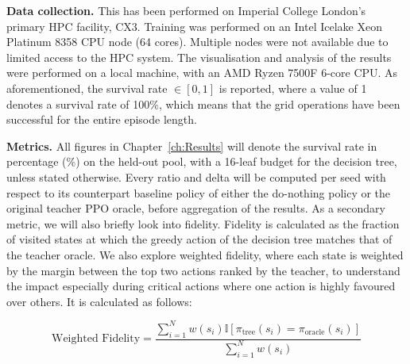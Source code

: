 \textbf{Data collection.} This has been performed on Imperial College London's primary HPC facility, CX3. Training was performed on an Intel Icelake Xeon Platinum 8358 CPU node (64 cores). Multiple nodes were not available due to limited access to the HPC system. The visualisation and analysis of the results were performed on a local machine, with an AMD Ryzen 7500F 6-core CPU. As aforementioned, the survival rate $\in [0, 1]$ is reported, where a value of 1 denotes a survival rate of 100\%, which means that the grid operations have been successful for the entire episode length.

\textbf{Metrics.} All figures in Chapter~\ref{ch:Results} will denote the survival rate in percentage (\%) on the held-out pool, with a 16-leaf budget for the decision tree, unless stated otherwise. Every ratio and delta will be computed per seed with respect to its counterpart baseline policy of either the do-nothing policy or the original teacher PPO oracle, before aggregation of the results. As a secondary metric, we will also briefly look into fidelity. Fidelity is calculated as the fraction of visited states at which the greedy action of the decision tree matches that of the teacher oracle. We also explore weighted fidelity, where each state is weighted by the margin between the top two actions ranked by the teacher, to understand the impact especially during critical actions where one action is highly favoured over others. It is calculated as follows:

\begin{equation}
\text{Weighted Fidelity} =
\frac{
\sum_{i=1}^{N}
w(s_i)
\mathbb{I}
\left[
\pi_{\text{tree}}(s_i)
=
\pi_{\text{oracle}}(s_i)
\right]
}{
\sum_{i=1}^{N} w(s_i)
}
\end{equation}



